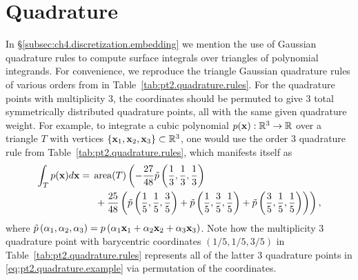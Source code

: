 %

\chapter{Quadrature} \label{ch:pt2.appendix.quadrature}

In \S\ref{subsec:ch4.discretization.embedding} we mention the use of Gaussian quadrature rules to compute surface integrals over triangles of polynomial integrands. For convenience, we reproduce the triangle Gaussian quadrature rules of various orders from \cite{Cowper73} in Table~\ref{tab:pt2.quadrature.rules}. For the quadrature points with multiplicity $3$, the coordinates should be permuted to give $3$ total symmetrically distributed quadrature points, all with the same given quadrature weight. For example, to integrate a cubic polynomial $p(\mathbf{x}) : \mathbb{R}^3 \to \mathbb{R}$ over a triangle $T$ with vertices $\{\mathbf{x}_1, \mathbf{x}_2, \mathbf{x}_3\} \subset \mathbb{R}^3$, one would use the order $3$ quadrature rule from Table~\ref{tab:pt2.quadrature.rules}, which manifests itself as
\begin{equation} \label{eq:pt2.quadrature.example}
\begin{split}
\int_T p(\mathbf{x}) d\mathbf{x} = {} & \operatorname{area}(T) \left( -\frac{27}{48} \tilde{p} \left( \frac{1}{3}, \frac{1}{3}, \frac{1}{3} \right) \right. \\ & \left. {} + \frac{25}{48} \left( \tilde{p} \left( \frac{1}{5}, \frac{1}{5}, \frac{3}{5} \right) + \tilde{p} \left( \frac{1}{5}, \frac{3}{5}, \frac{1}{5} \right) + \tilde{p} \left( \frac{3}{5}, \frac{1}{5}, \frac{1}{5} \right) \right) \right),
\end{split}
\end{equation}
where $\tilde{p} \left( \alpha_1, \alpha_2, \alpha_3 \right) = p \left( \alpha_1 \mathbf{x}_1 + \alpha_2 \mathbf{x}_2 + \alpha_3 \mathbf{x}_3 \right)$. Note how the multiplicity $3$ quadrature point with barycentric coordinates $(1/5, 1/5, 3/5)$ in Table~\ref{tab:pt2.quadrature.rules} represents all of the latter $3$ quadrature points in \eqref{eq:pt2.quadrature.example} via permutation of the coordinates.

